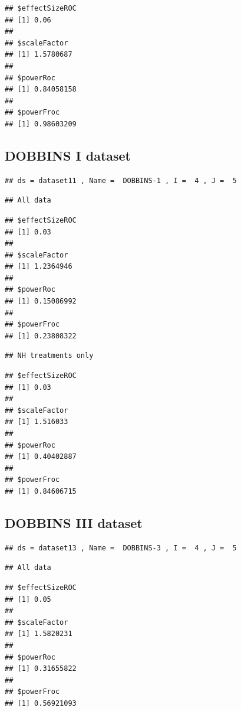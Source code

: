 \documentclass[
]{book}
\begin{document}
\begin{verbatim}
## $effectSizeROC
## [1] 0.06
## 
## $scaleFactor
## [1] 1.5780687
## 
## $powerRoc
## [1] 0.84058158
## 
## $powerFroc
## [1] 0.98603209
\end{verbatim}

\hypertarget{dobbins-i-dataset}{%
\subsection{DOBBINS I dataset}\label{dobbins-i-dataset}}

\begin{verbatim}
## ds = dataset11 , Name =  DOBBINS-1 , I =  4 , J =  5
\end{verbatim}

\begin{verbatim}
## All data
\end{verbatim}

\begin{verbatim}
## $effectSizeROC
## [1] 0.03
## 
## $scaleFactor
## [1] 1.2364946
## 
## $powerRoc
## [1] 0.15086992
## 
## $powerFroc
## [1] 0.23808322
\end{verbatim}

\begin{verbatim}
## NH treatments only
\end{verbatim}

\begin{verbatim}
## $effectSizeROC
## [1] 0.03
## 
## $scaleFactor
## [1] 1.516033
## 
## $powerRoc
## [1] 0.40402887
## 
## $powerFroc
## [1] 0.84606715
\end{verbatim}

\hypertarget{dobbins-iii-dataset}{%
\subsection{DOBBINS III dataset}\label{dobbins-iii-dataset}}

\begin{verbatim}
## ds = dataset13 , Name =  DOBBINS-3 , I =  4 , J =  5
\end{verbatim}

\begin{verbatim}
## All data
\end{verbatim}

\begin{verbatim}
## $effectSizeROC
## [1] 0.05
## 
## $scaleFactor
## [1] 1.5820231
## 
## $powerRoc
## [1] 0.31655822
## 
## $powerFroc
## [1] 0.56921093
\end{verbatim}
\end{document}
